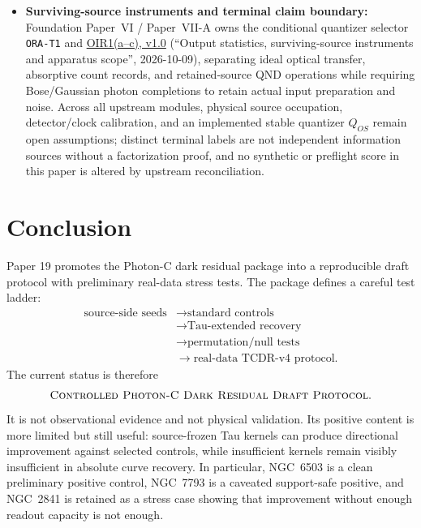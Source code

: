 \documentclass[11pt]{article}
\begin{document}
\begin{itemize}
  \item \textbf{Surviving-source instruments and terminal claim boundary:}
  Foundation Paper~VI / Paper~VII-A owns the conditional quantizer selector
  \texttt{ORA-T1} and
  \href{https://github.com/tau-core-research/tau-core-quantum-readout-foundation-paper-vi/blob/main/paperVI_submission_source/main.pdf#nameddest=oir1}{OIR1(a--c), v1.0}
  (``Output statistics, surviving-source instruments and apparatus scope'',
  2026-10-09), separating ideal optical transfer, absorptive count records, and
  retained-source QND operations while requiring Bose/Gaussian photon
  completions to retain actual input preparation and noise.  Across all upstream
  modules, physical source occupation, detector/clock calibration, and an
  implemented stable quantizer \(Q_{OS}\) remain open assumptions; distinct
  terminal labels are not independent information sources without a
  factorization proof, and no synthetic or preflight score in this paper is
  altered by upstream reconciliation.
\end{itemize}

\section{Conclusion}

Paper 19 promotes the Photon-C dark residual package into a reproducible draft
protocol with preliminary real-data stress tests.  The package defines a
careful test ladder:
\begin{align*}
  \text{source-side seeds}
  &\rightarrow \text{standard controls}\\
  &\rightarrow \text{Tau-extended recovery}\\
  &\rightarrow \text{permutation/null tests}\\
  &\rightarrow \text{real-data TCDR-v4 protocol}.
\end{align*}
The current status is therefore
\[
  \textsc{Controlled Photon-C Dark Residual Draft Protocol}.
\]
It is not observational evidence and not physical validation.  Its positive
content is more limited but still useful: source-frozen Tau kernels can produce
directional improvement against selected controls, while insufficient kernels
remain visibly insufficient in absolute curve recovery.  In particular,
NGC~6503 is a clean preliminary positive control, NGC~7793 is a caveated
support-safe positive, and NGC~2841 is retained as a stress case showing that
improvement without enough readout capacity is not enough.
\end{document}

